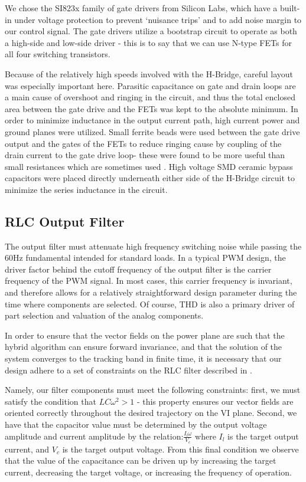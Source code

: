 We chose the SI823x family of gate drivers from Silicon Labs, which have a built-in under voltage protection to prevent `nuisance trips' and to add noise margin to our control signal. The gate drivers utilize a bootstrap circuit to operate as both a high-side and low-side driver - this is to say that we can use N-type FETs for all four switching transistors. 

Because of the relatively high speeds involved with the H-Bridge, careful layout was especially important here. Parasitic capacitance on gate and drain loops are a main cause of overshoot and ringing in the circuit, and thus the total enclosed area between the gate drive and the FETs was kept to the absolute minimum. In order to minimize inductance in the output current path, high current power and ground planes were utilized. Small ferrite beads were used between the gate drive output and the gates of the FETs to reduce ringing cause by coupling of the drain current to the gate drive loop- these were found to be more useful than small resistances which are sometimes used \cite{transphorm}. High voltage SMD ceramic bypass capacitors were placed directly underneath either side of the H-Bridge circuit to minimize the series inductance in the circuit. 
  
\subsection{RLC Output Filter}
The output filter must attenuate high frequency switching noise while passing the 60Hz fundamental intended for standard loads. In a typical PWM design, the driver factor behind the cutoff frequency of the output filter is the carrier frequency of the PWM signal. In most cases, this carrier frequency is invariant, and therefore allows for a relatively straightforward design parameter during the time where components are selected. Of course, THD is also a primary driver of part selection and valuation of the analog components.

In order to ensure that the vector fields on the power plane are such that the hybrid algorithm can ensure forward invariance, and that the solution of the system converges to the tracking band in finite time, it is necessary that our design adhere to a set of constraints on the RLC filter described in \cite{ricardo}. 

Namely, our filter components must meet the following constraints: first, we must satisfy the condition that $LC\omega^2>1$ - this property ensures our vector fields are oriented correctly throughout the desired trajectory on the VI plane. Second, we have that the capacitor value must be determined by the output voltage amplitude and current amplitude by the relation:$\frac{I_l\omega}{V_c}$ where $I_l$ is the target output current, and $V_c$ is the target output voltage. From this final condition we observe that the value of the capacitance can be driven up by increasing the target current, decreasing the target voltage, or increasing the frequency of operation. 

